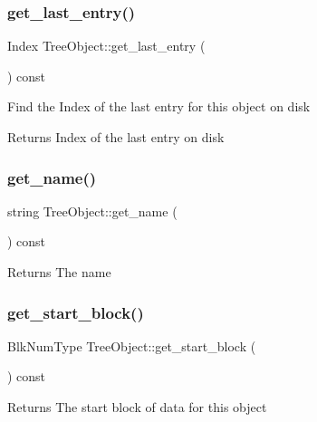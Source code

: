 \subsubsection{\texorpdfstring{get\+\_\+last\+\_\+entry()}{get\_last\_entry()}}
{\footnotesize\ttfamily Index Tree\+Object\+::get\+\_\+last\+\_\+entry (\begin{DoxyParamCaption}{ }\end{DoxyParamCaption}) const}

Find the Index of the last entry for this object on disk \begin{DoxyReturn}{Returns}
Index of the last entry on disk 
\end{DoxyReturn}
\mbox{\label{class_tree_object_a5216922ec0b98bcc375601db8d253770}} 
\subsubsection{\texorpdfstring{get\+\_\+name()}{get\_name()}}
{\footnotesize\ttfamily string Tree\+Object\+::get\+\_\+name (\begin{DoxyParamCaption}{ }\end{DoxyParamCaption}) const}

\begin{DoxyReturn}{Returns}
The name 
\end{DoxyReturn}
\mbox{\label{class_tree_object_a16153734dbee4adc99fa195715728c2f}} 
\subsubsection{\texorpdfstring{get\+\_\+start\+\_\+block()}{get\_start\_block()}}
{\footnotesize\ttfamily Blk\+Num\+Type Tree\+Object\+::get\+\_\+start\+\_\+block (\begin{DoxyParamCaption}{ }\end{DoxyParamCaption}) const}

\begin{DoxyReturn}{Returns}
The start block of data for this object 
\end{DoxyReturn}
\mbox{\label{class_tree_object_a6b6f0a5c23577748b489652013fa1728}} 
